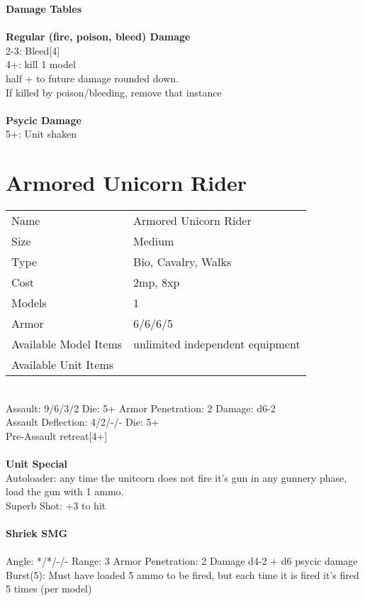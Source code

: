 {\bf Damage Tables} \\
\ \\ {\bf Regular (fire, poison, bleed) Damage } \\
2-3: Bleed[4] \\
4+: kill 1 model\\ half + to future damage rounded down. \\ If killed by poison/bleeding, remove that instance \\
\ \\ {\bf Psycic Damage } \\
5+: Unit shaken \\









\pagebreak

\section{ Armored Unicorn Rider }

\begin{tabular}{ll}
  Name & Armored Unicorn Rider \\
  Size & Medium\\
  Type & Bio, Cavalry, Walks\\
  Cost & 2mp, 8xp\\
  Models & 1\\
  Armor & 6/6/6/5\\
  Available Model Items & unlimited independent equipment \\
  Available Unit Items &  \\
\end{tabular}

\ \\
Assault: 9/6/3/2 Die: 5+ Armor Penetration: 2 Damage: d6-2 \\
Assault Deflection: 4/2/-/- Die: 5+\\
\indent Pre-Assault retreat[4+] \\
\ \\

{\bf Unit Special} \\
Autoloader: any time the unitcorn does not fire it's gun in any gunnery phase, load the gun with 1 ammo. \\ Superb Shot: +3 to hit
\ \\
\ \\
{\bf Shriek SMG } \\
\ \\
Angle: */*/-/- Range: 3 Armor Penetration: 2 Damage d4-2 + d6 psycic damage \\
\indent Burst(5): Must have loaded 5 ammo to be fired, but each time it is fired it's fired 5 times (per model) \\





